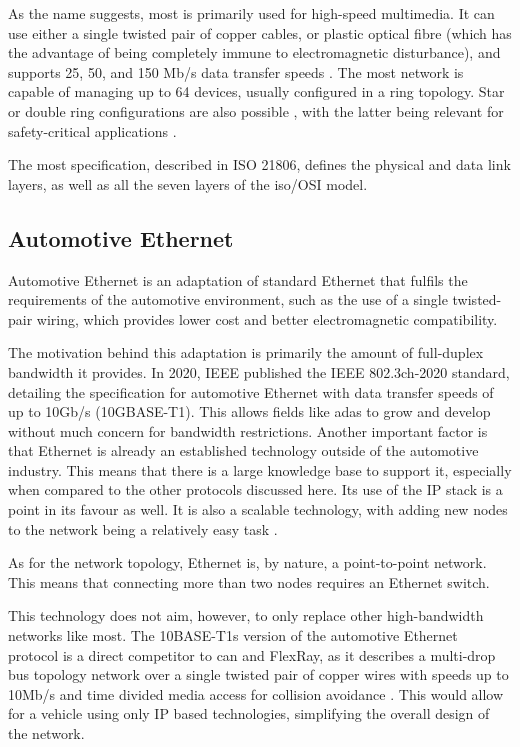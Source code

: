 As the name suggests, \gls{most} is primarily used for high-speed multimedia. It can use either a single twisted pair of copper cables, or plastic optical fibre (which has the advantage of being completely immune to electromagnetic disturbance), and supports 25, 50, and 150 Mb/s data transfer speeds \citep{MOSTMicrochip}. The \gls{most} network is capable of managing up to 64 devices, usually configured in a ring topology. Star or double ring configurations are also possible \citep{MOSTVector}, with the latter being relevant for safety-critical applications \citep{Huang2019}.\par
The \gls{most} specification, described in ISO 21806, defines the physical and data link layers, as well as all the seven layers of the \gls{iso}/OSI model.

\subsection{Automotive Ethernet}

Automotive Ethernet is an adaptation of standard Ethernet that fulfils the requirements of the automotive environment, such as the use of a single twisted-pair wiring, which provides lower cost and better electromagnetic compatibility.\par
The motivation behind this adaptation is primarily the amount of full-duplex bandwidth it provides. In 2020, IEEE published the IEEE 802.3ch-2020 standard, detailing the specification for automotive Ethernet with data transfer speeds of up to 10Gb/s (10GBASE-T1). This allows fields like \gls{adas} to grow and develop without much concern for bandwidth restrictions. Another important factor is that Ethernet is already an established technology outside of the automotive industry. This means that there is a large knowledge base to support it, especially when compared to the other protocols discussed here. Its use of the IP stack is a point in its favour as well. It is also a scalable technology, with adding new nodes to the network being a relatively easy task \citep{Bello2011}.\par
As for the network topology, Ethernet is, by nature, a point-to-point network. This means that connecting more than two nodes requires an Ethernet switch.\par
This technology does not aim, however, to only replace other high-bandwidth networks like \gls{most}. The 10BASE-T1s version of the automotive Ethernet protocol is a direct competitor to \gls{can} and FlexRay, as it describes a multi-drop bus topology network over a single twisted pair of copper wires with speeds up to 10Mb/s and time divided media access for collision avoidance \citep{AutomotiveNetworks}. This would allow for a vehicle using only IP based technologies, simplifying the overall design of the network.

